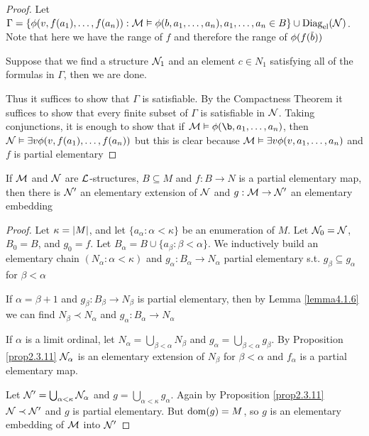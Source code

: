 \documentclass[11pt]{article}
\begin{document}
\begin{proof}
Let \(\Gamma=\{\phi(v,f(a_1),\dots,f(a_n)):\mathcal{M}\vDash\phi(b,a_1,\dots,a_n),a_1,\dots,a_n\in B\}\cup\operatorname{Diag}_{\operatorname{el}}(\mathcal{N})\). Note that here we
have the range of \(f\) and therefore the range of \(\phi(f(\barb))\)

Suppose that we find a structure \(\mathcal{N}_1\) and an element \(c\in N_1\) satisfying all of the formulas
in \(\Gamma\), then we are done.

Thus it suffices to show that \(\Gamma\) is satisfiable. By the Compactness Theorem it suffices to show
that every finite subset of \(\Gamma\) is satisfiable in \(\mathcal{N}\). Taking conjunctions, it is enough to show
that if \(\calm\vDash\phi(\b,a_1,\dots,a_n)\), then \(\mathcal{N}\vDash\exists v\phi(v,f(a_1),\dots,f(a_n))\) but this is clear because
\(\mathcal{M}\vDash\exists v\phi(v,a_1,\dots,a_n)\) and \(f\) is partial elementary
\end{proof}

\begin{corollary}[]
\label{cor4.1.7}
If \(\mathcal{M}\) and \(\mathcal{N}\) are \(\mathcal{L}\)-structures, \(B\subseteq M\) and \(f:B\to N\) is a partial elementary map,
then there is \(\mathcal{N}'\) an elementary extension of \(\mathcal{N}\) and \(g:\mathcal{M}\to\mathcal{N}'\) an elementary embedding
\end{corollary}

\begin{proof}
Let \(\kappa=\abs{M}\), and let \(\{a_\alpha:\alpha<\kappa\}\) be an enumeration of \(M\). Let \(\mathcal{N}_0=\mathcal{N}\), \(B_0=B\),
and \(g_0=f\). Let \(B_\alpha=B\cup\{a_\beta:\beta<\alpha\}\). We inductively build an elementary chain \((N_\alpha:\alpha<\kappa)\)
and \(g_\alpha:B_\alpha\to N_\alpha\) partial elementary s.t. \(g_\beta\subseteq g_\alpha\) for \(\beta<\alpha\)

If \(\alpha=\beta+1\) and \(g_\beta:B_\beta\to N_\beta\) is partial elementary, then by Lemma \ref{lemma4.1.6}  we can
find \(N_\beta\prec N_\alpha\) and \(g_\alpha:B_\alpha\to N_\alpha\)

If \(\alpha\) is a limit ordinal, let \(N_\alpha=\bigcup_{\beta<\alpha}N_\beta\) and \(g_\alpha=\bigcup_{\beta<\alpha}g_\beta\). By Proposition
\ref{prop2.3.11} \(\mathcal{N}_\alpha\) is an elementary extension of \(N_\beta\) for \(\beta<\alpha\) and \(f_\alpha\) is a partial
elementary map.

Let \(\mathcal{N}'=\bigcup_{\alpha<\kappa}\mathcal{N}_\alpha\) and \(g​=\bigcup_{\alpha<\kappa}g_\alpha\). Again by Proposition \ref{prop2.3.11} \(\mathcal{N}\prec\mathcal{N}'\)
and \(g\) is partial elementary. But \(\operatorname{dom}(g)=M\), so \(g\) is an elementary embedding of \(\mathcal{M}\)
into \(\mathcal{N}'\)
\end{proof}
\end{document}
